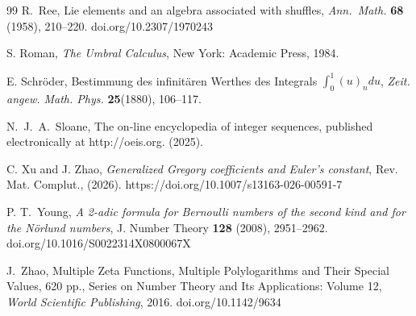 \documentclass[11pt]{article}
\theoremstyle{plain}
\theoremstyle{definition}
\begin{document}
\begin{thebibliography}{99}
R.\ Ree, Lie elements and an algebra associated with shuffles,
\emph{Ann.\ Math.} \textbf{68} (1958), 210--220. doi.org/10.2307/1970243

S. Roman, \emph{The Umbral Calculus}, New York: Academic Press, 1984.

E. Schr\"oder, Bestimmung des infinit\"aren Werthes des Integrals $\int_0^1 (u)_n du$,
\emph{Zeit. angew. Math. Phys.} \textbf{25}(1880), 106--117.

N.\ J.\ A.\ Sloane, The on-line encyclopedia of integer sequences, published electronically at http://oeis.org. (2025).

C. Xu and J. Zhao, \emph{Generalized Gregory coefficients and Euler's constant}, Rev. Mat. Complut., (2026). https://doi.org/10.1007/s13163-026-00591-7


P. T.\ Young, \emph{A 2-adic formula for Bernoulli numbers of the second kind and for the N\"orlund numbers}, J. Number Theory \textbf{128} (2008), 2951--2962. doi.org/10.1016/S0022314X0800067X


J.\ Zhao, Multiple Zeta Functions, Multiple Polylogarithms and Their Special Values, 620 pp., Series on Number Theory and Its Applications: Volume 12, \emph{World Scientific Publishing}, 2016. doi.org/10.1142/9634

\end{thebibliography}
\end{document}
